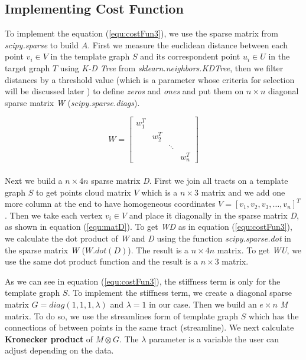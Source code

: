 \documentclass[../structure.tex]{subfiles}
\begin{document}
\subsection{Implementing Cost Function}
\hspace{2em}To implement the equation (\ref{equ:costFun3}), we use the sparse matrix from \textit{scipy.sparse} to build $A$. First we measure the euclidean distance between each point $v_{i}\in V$ in the template graph $S$ and its correspondent point $u_{i}\in U$ in the target graph $T$ using \textit{K-D Tree} from \textit{sklearn.neighbors.KDTree}, then we filter distances by a threshold value (which is a parameter whose criteria for selection will be discussed later ) to define \textit{zeros} and \textit{ones} and put them on $n\times n$ diagonal sparse matrix \textit{W} (\textit{scipy.sparse.diags}).

\begin{equation*}
W =
\begin{bmatrix}
w_{1}^T & & & \\
& w_{2}^T & & \\
& & \ddots & \\
& & & w_{n}^T
\end{bmatrix}
\end{equation*}\\

Next we build a $n\times 4n$ sparse matrix \textit{D}. First we join all tracts on a template graph $S$ to get points cloud matrix $V$ which is a $n\times 3$ matrix and we add one more column at the end to have homogeneous coordinates $V=[v_{1}, v_{2}, v_{3}, \dots , v_{n}]^T$. Then we take each vertex $v_{i} \in V$ and place it diagonally in the sparse matrix \textit{D},  as shown in equation (\ref{equ:matD}). To get \textit{WD} as in equation (\ref{equ:costFun3}), we calculate the dot product of \textit{W} and \textit{D} using the function \textit{scipy.sparse.dot} in the sparse matrix \textit{W} ($W.dot(D)$). The result is a $n\times 4n$ matrix. To get \textit{WU}, we use the same dot product function and the result is a $n\times 3$ matrix.

As we can see in equation (\ref{equ:costFun3}), the stiffness term is only for the template graph $S$. To implement the stiffness term, we create a diagonal sparse matrix $G = diag(1,1,1,\lambda)$ and $\lambda=1$ in our case. Then we build an $e\times n$ \textit{M} matrix. To do so, we use the streamlines form of template graph $S$ which has the connections of between points in the same tract (streamline). We next calculate \textbf{Kronecker product} of $M \otimes G$. The $\lambda$ parameter is a variable the user can adjust depending on the data.
\end{document}
